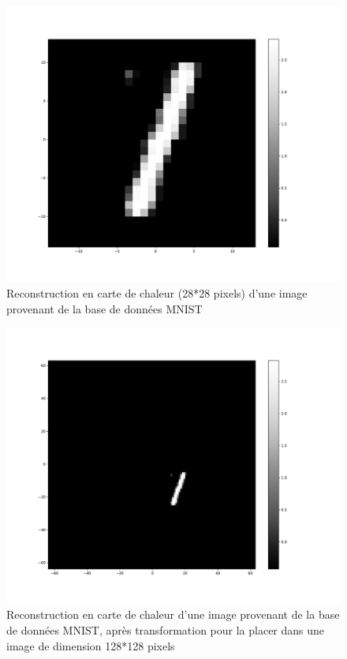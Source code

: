 \begin{figure}[th]
\centering
\includegraphics[scale=0.3]{Figures/MNIST_28}
\decoRule
\caption[Figure]{Reconstruction en carte de chaleur (28*28 pixels) d'une image provenant de la base de données MNIST}
\label{fig:MNIST_28}
\end{figure}

\begin{figure}[th]
\centering
\includegraphics[scale=0.3]{Figures/mnist_128}
\decoRule
\caption[Figure]{Reconstruction en carte de chaleur d'une image provenant de la base de données MNIST, après transformation pour la placer dans une image de dimension 128*128 pixels}
\label{fig:MNIST_128}
\end{figure}

